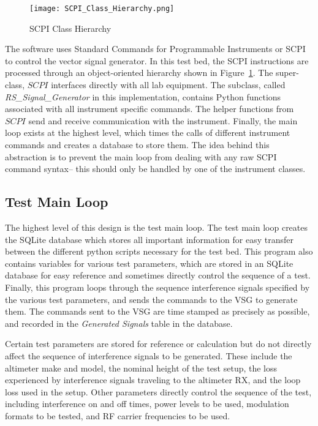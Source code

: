 \begin{figure}[ht]
\centering
\texttt{[image: SCPI\_Class\_Hierarchy.png]}
\caption{SCPI Class Hierarchy}

\label{fig:SCPI}

\end{figure}
The software uses Standard Commands for Programmable Instruments or SCPI to control the vector signal generator. In this test bed, the SCPI instructions are processed through an object-oriented hierarchy shown in Figure~\ref{fig:SCPI}. The super-class, $SCPI$ interfaces directly with all lab equipment. The subclass, called \textit{RS\_Signal\_Generator} in this implementation, contains Python functions associated with all instrument specific commands. The helper functions from $SCPI$ send and receive communication with the instrument. Finally, the main loop exists at the highest level, which times the calls of different instrument commands and creates a database to store them. The idea behind this abstraction is to prevent the main loop from dealing with any raw SCPI command syntax-- this should only be handled by one of the instrument classes. 



\subsection{Test Main Loop}\label{sub:mainloop}
The highest level of this design is the test main loop. The test main loop creates the SQLite database which stores all important information for easy transfer between the different python scripts necessary for the test bed. This program also contains variables for various test parameters, which are stored in an SQLite database for easy reference and sometimes directly control the sequence of a test. Finally, this program loops through the sequence interference signals specified by the various test parameters, and sends the commands to the VSG to generate them. The commands sent to the VSG are time stamped as precisely as possible, and recorded in the \textit{Generated Signals} table in the database. 


Certain test parameters are stored for reference or calculation but do not directly affect the sequence of interference signals to be generated. These include the altimeter make and model, the nominal height of the test setup, the loss experienced by interference signals traveling to the altimeter RX, and the loop loss used in the setup. Other parameters directly control the sequence of the test, including interference on and off times, power levels to be used, modulation formats to be tested, and RF carrier frequencies to be used. 

